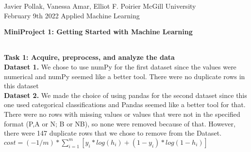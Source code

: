 \documentclass[11pt]{article}
\begin{document}
\noindent Javier Pollak, Vanessa Amar, Elliot F. Poirier
\hfill
McGill University
\\
February 9th 2022
\hfill
Applied Machine Learning
\\
\begin{center}
\textbf{\LARGE{MiniProject 1: Getting Started with Machine Learning}}   
\end{center}
\hfill
\\

\noindent \textbf{\Large{Task 1: Acquire, preprocess, and analyze the data}}\\
\noindent \textbf{Dataset 1.} We chose to use numPy for the first dataset since the values were numerical and numPy seemed like a better tool. There were no duplicate rows in this dataset\\
\noindent \textbf{Dataset 2.} We made the choice of using pandas for the second dataset since this one used categorical classifications and Pandas seemed like a better tool for that. There were no rows with missing values or values that were not in the specified format (P,A or N; B or NB), so none were removed because of that. However, there were 147 duplicate rows that we chose to remove from the Dataset. \\ 

$
cost = (-1/m) * \sum_{i=1}^{m} [ y_i * log(h_i) + (1 - y_i) * log(1 - h_i) ]
$
\end{document}
